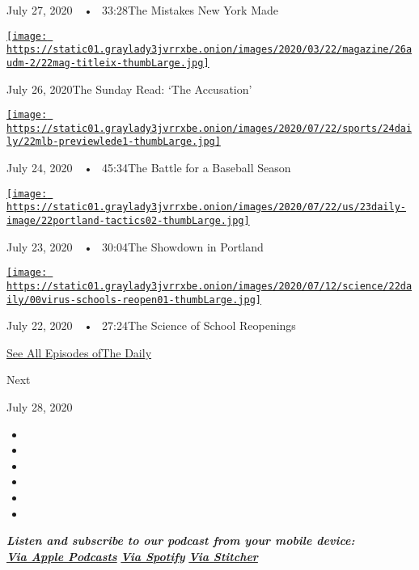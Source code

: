 July 27, 2020~~•~ 33:28The Mistakes New York Made

\href{https://www.nytimes3xbfgragh.onion/2020/07/26/podcasts/the-daily/the-accusation-the-sunday-read.html?action=click\&module=audio-series-bar\&region=header\&pgtype=Article}{\texttt{[image: https://static01.graylady3jvrrxbe.onion/images/2020/03/22/magazine/26audm-2/22mag-titleix-thumbLarge.jpg]}}

July 26, 2020The Sunday Read: `The Accusation'

\href{https://www.nytimes3xbfgragh.onion/2020/07/24/podcasts/the-daily/mlb-baseball-season-coronavirus.html?action=click\&module=audio-series-bar\&region=header\&pgtype=Article}{\texttt{[image: https://static01.graylady3jvrrxbe.onion/images/2020/07/22/sports/24daily/22mlb-previewlede1-thumbLarge.jpg]}}

July 24, 2020~~•~ 45:34The Battle for a Baseball Season

\href{https://www.nytimes3xbfgragh.onion/2020/07/23/podcasts/the-daily/portland-protests.html?action=click\&module=audio-series-bar\&region=header\&pgtype=Article}{\texttt{[image: https://static01.graylady3jvrrxbe.onion/images/2020/07/22/us/23daily-image/22portland-tactics02-thumbLarge.jpg]}}

July 23, 2020~~•~ 30:04The Showdown in Portland

\href{https://www.nytimes3xbfgragh.onion/2020/07/22/podcasts/the-daily/school-reopenings-coronavirus.html?action=click\&module=audio-series-bar\&region=header\&pgtype=Article}{\texttt{[image: https://static01.graylady3jvrrxbe.onion/images/2020/07/12/science/22daily/00virus-schools-reopen01-thumbLarge.jpg]}}

July 22, 2020~~•~ 27:24The Science of School Reopenings

\href{https://www.nytimes3xbfgragh.onion/column/the-daily}{See All
Episodes ofThe Daily}

Next

July 28, 2020

\begin{itemize}
\item
\item
\item
\item
\item
\item
\end{itemize}

\emph{\textbf{Listen and subscribe to our podcast from your mobile
device:}}\\
\textbf{\href{https://itunes.apple.com/us/podcast/the-daily/id1200361736?mt=2}{\emph{Via
Apple Podcasts}}} \emph{\textbf{\textbar{}}}
\textbf{\href{https://open.spotify.com/show/3IM0lmZxpFAY7CwMuv9H4g?si=SfuMSC55R1qprFsRZU3_zw}{\emph{Via
Spotify}}} \emph{\textbf{\textbar{}}}
\textbf{\href{http://www.stitcher.com/podcast/the-new-york-times/the-daily-10}{\emph{Via
Stitcher}}}

